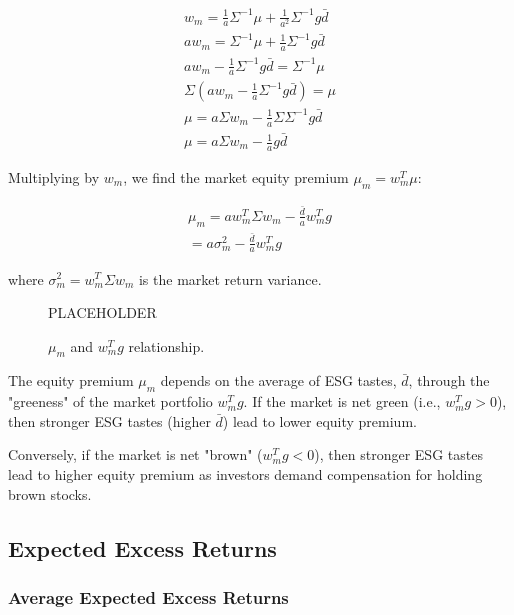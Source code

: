 \begin{equation}
    \begin{aligned}
    w_m = \frac{1}{a} \Sigma^{-1} \mu + \frac{1}{a^2} \Sigma^{-1} g \bar{d} \\
    a w_m = \Sigma^{-1} \mu + \frac{1}{a} \Sigma^{-1} g \bar{d} \\
    a w_m - \frac{1}{a} \Sigma^{-1} g \bar{d} = \Sigma^{-1} \mu \\
    \Sigma (a w_m - \frac{1}{a} \Sigma^{-1} g \bar{d}) = \mu \\ 
    \mu = a \Sigma w_m - \frac{1}{a} \Sigma \Sigma^{-1} g \bar{d} \\
    \mu = a \Sigma w_m - \frac{1}{a} g \bar{d}
    \end{aligned}
\end{equation}

Multiplying by $w_m$, we find the market equity premium $\mu_m = w_m^T \mu$:

\begin{equation}
    \begin{aligned}
    \mu_m = a w_m^T \Sigma w_m - \frac{\bar{d}}{a} w_m^T g  \\
    = a \sigma_m^2 - \frac{\bar{d}}{a} w_m^T g 
    \end{aligned}
\end{equation}

where $\sigma_m^2 = w_m^T \Sigma w_m$ is the market return variance. 

\begin{figure}
    \centering
    PLACEHOLDER
    \caption{$\mu_m$ and $w_m^Tg$ relationship.}
    \label{fig:green_market}
\end{figure}

The equity premium $\mu_m$ depends on the average of ESG tastes, $\bar{d}$,
through the "greeness" of the market portfolio $w_m^T g$.
If the market is net green (i.e., $w_m^T g > 0$), then stronger 
ESG tastes (higher $\bar{d}$) lead to lower equity premium.

Conversely, if the market is net "brown" ($w_m^T g < 0$), then stronger
ESG tastes lead to higher equity premium as investors demand 
compensation for holding brown stocks.


\subsection{Expected Excess Returns}

\subsubsection{Average Expected Excess Returns}

